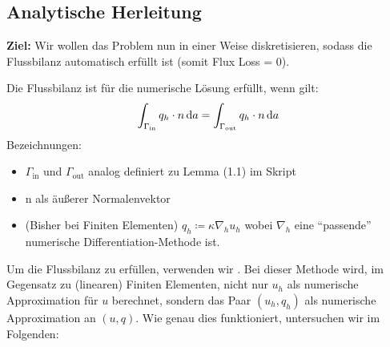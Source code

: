 
\subsection{Analytische Herleitung}

\textbf{Ziel:} Wir wollen das Problem nun in einer Weise diskretisieren, sodass die Flussbilanz automatisch erfüllt ist (somit Flux Loss = 0).

Die Flussbilanz ist für die numerische Lösung erfüllt, wenn gilt:
\[ \int_{\Gamma_\text{in}} q_h \cdot n \mathop{}\!\mathrm{d} a = \int_{\Gamma_\text{out}} q_h \cdot n \mathop{}\!\mathrm{d} a \]
Bezeichnungen:
\begin{itemize}
	\item $ \Gamma_\text{in} $ und $ \Gamma_\text{out} $ analog definiert zu Lemma (1.1) im Skript
	\item n als äußerer Normalenvektor
	\item (Bisher bei Finiten Elementen) $ q_h \coloneqq \kappa \nabla_h u_h$ wobei $ \nabla_h $ eine \enquote{passende} numerische Differentiation-Methode ist.
\end{itemize}

Um die Flussbilanz zu erfüllen, verwenden wir . Bei dieser Methode wird, im Gegensatz zu (linearen) Finiten Elementen, nicht nur $ u_h $ als numerische Approximation für $ u $ berechnet, sondern das Paar $ (u_h,q_h) $ als numerische Approximation an $ (u,q) $. Wie genau dies funktioniert, untersuchen wir im Folgenden:

